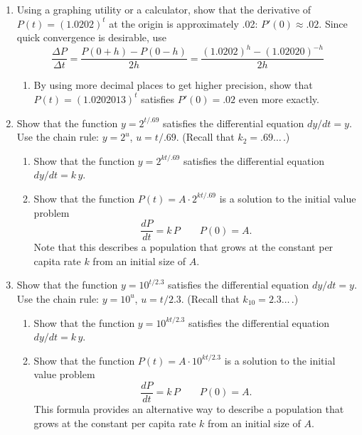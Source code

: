 \begin{enumerate}
\item Using a graphing utility or a calculator, show that the derivative of $P(t)=(1.0202)^t$ at the origin is approximately .02: $P'(0) \approx .02$.  Since quick convergence is desirable, use
	\[
\dfrac{\Delta P}{\Delta t} = \dfrac{P(0+h) - P(0-h)}{2h}
		= \dfrac{(1.0202)^h - (1.02020)^{-h}}{2h}
\]


  \begin{enumerate}
  \item By using more decimal places to get higher precision, show that $P(t) = (1.0202013)^t$ satisfies $P'(0) = .02$ even more exactly.


\end{enumerate}
\item \label{ex:base 2} Show that the function $y = 2^{t/.69}$ satisfies the differential equation $dy/dt = y$.  Use the chain rule: $y = 2^u$, $u = t/.69$. (Recall that $k_2=.69\ldots\,.$)


  \begin{enumerate}
  \item Show that the function $y = 2^{kt/.69}$ satisfies the differential equation $dy/dt = k\,y$.

  \item Show that the function $P(t) = A \cdot 2^{kt/.69}$ is a solution to the initial value problem
	\[
\dfrac{dP}{dt} = k\,P \qquad P(0) = A.
\]
Note that this describes a population that grows at the constant per capita rate $k$ from an initial size of $A$.



\end{enumerate}
\item Show that the function $y = 10^{t/2.3}$ satisfies the differential equation $dy/dt = y$.  Use the chain rule: $y = 10^u$, $u = t/2.3$. (Recall that $k_{10}=2.3\ldots\,.$)


  \begin{enumerate}
  \item Show that the function $y = 10^{kt/2.3}$ satisfies the differential equation $dy/dt = k\,y$.

  \item Show that the function $P(t) = A \cdot 10^{kt/2.3}$ is a solution to the initial value problem
	\[
\dfrac{dP}{dt} = k\,P \qquad P(0) = A.
\]
This formula provides an alternative way to describe a population that grows at the constant per capita rate $k$ from an initial size of $A$.




\end{enumerate}
\end{enumerate}
